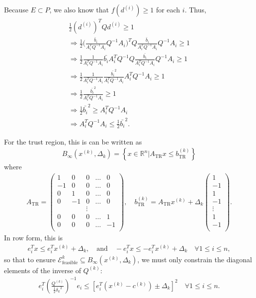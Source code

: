 \documentclass{article}
\theoremstyle{case}
\numberwithin{theorem}{subsection}
\newcommand{\atr}{{A_{\textrm{TR}}}}
\newcommand{\btrk}{{b^{(k)}_{\textrm{TR}}}}
\newcommand{\ck}{{c^{(k)}}}
\newcommand{\dk}{\Delta_k}
\newcommand{\qk}{{Q^{(k)}}}
\newcommand{\Rn}{\mathbb R^n}
\newcommand{\sdk}{{\delta_k}}
\newcommand{\tr}{{ B_{\infty}\left(\xk, \dk\right) }}
\newcommand{\unshiftedellipsoid}{{\mathcal E^k_{\textrm{feasible}}}}
\newcommand{\xk}{{x^{(k)}}}
\begin{document}
Because $E \subset P$, we also know that $f(d^{(i)}) \ge 1$ for each $i$. Thus,
\begin{align*}
\frac 1 2 (d^{(i)})^{T} Q d^{(i)} \ge 1 \\
\Longrightarrow \frac 1 2 \bigg(\frac {\bar{b}_i}{A_i^T  Q^{-1}A_i}  Q^{-1}A_i\bigg)^{T} Q \frac {\bar{b}_i}{A_i^T  Q^{-1}A_i}  Q^{-1}A_i \ge 1 \\
\Longrightarrow \frac 1 2 \frac {1}{A_i^T  Q^{-1}A_i}  \bar{b_i} A_i^T Q^{-1} Q \frac {\bar{b_i}}{A_i^T  Q^{-1}A_i}  Q^{-1}A_i \ge 1 \\
\Longrightarrow \frac 1 2 \frac {1}{A_i^T  Q^{-1}A_i}  \frac {\bar{b_i}^2}{A_i^T  Q^{-1}A_i}  A_i^T Q^{-1}A_i \ge 1 \\
\Longrightarrow \frac 1 2  \frac {\bar{b_i}^2}{A_i^T  Q^{-1}A_i} \ge 1 \\
\Longrightarrow \frac 1 2 \bar{b_i}^2\ge A_i^T  Q^{-1}A_i \\
\Longrightarrow A_i^T  Q^{-1}A_i \le \frac 1 2 \bar{b_i}^2.
\end{align*}

For the trust region, this is can be written as
\begin{align*}
\tr = \left\{ x \in \Rn | \atr x\le\btrk\right\}
\end{align*}
where
\begin{align*}
\atr = \begin{pmatrix}
 1 &  0 & 0      & \ldots &  0 \\
-1 &  0 & 0      & \ldots &  0 \\
 0 &  1 & 0      & \ldots &  0 \\
 0 & -1 & 0      & \ldots &  0 \\
   &    & \vdots &        &    \\
 0 &  0 &      0 & \ldots &  1 \\
 0 &  0 &      0 & \ldots & -1 \\
\end{pmatrix}, \quad
\btrk = \atr \xk + \dk \begin{pmatrix}
1 \\
-1 \\
1 \\
-1 \\
\vdots \\
1 \\
-1 \\
\end{pmatrix}.
\end{align*}
In row form, this is
\begin{align*}
e_i ^T x \le e_i^T\xk + \dk, \quad \textrm{and} \quad
-e_i ^T x \le -e_i^T\xk + \dk \quad \forall 1 \le i \le n,
\end{align*}
so that to ensure $\unshiftedellipsoid \subseteq \tr$, we must only constrain the diagonal elements of the inverse of $\qk$:
\begin{align}
e_i^T\left(\frac{\qk}{\frac 1 2 \sdk^2}\right)^{-1} e_i \le \left[e_i^T\left(\xk - \ck\right) \pm \dk \right]^2 \quad \forall 1 \le i \le n.
\label{ellipsoids_trust_region_constraints}
\end{align}
\end{document}
